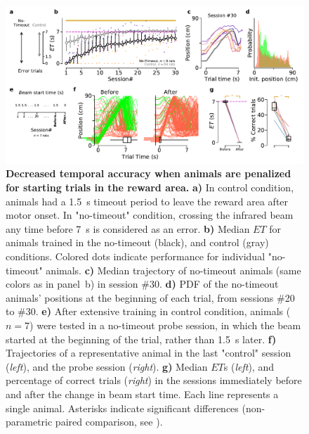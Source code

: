  \begin{figure}[bt!]
  \begin{center}
    \includegraphics[width=.8\linewidth]{ch-time/figures/NToTrd.pdf}
    \caption[No-timeout condition]
    {\textbf{Decreased temporal accuracy when animals are penalized for starting trials in the reward area.}
    \textbf{a)}
    In control condition, animals had a 1.5~s timeout period to leave the reward area after motor onset.
    In "no-timeout" condition, crossing the infrared beam any time before 7~s is considered as an error.
    \textbf{b)}
    Median $ET$ for animals trained in the no-timeout (black), and control (gray) conditions.
    Colored dots indicate performance for individual "no-timeout" animals.
    \textbf{c)}
    Median trajectory of no-timeout animals (same colors as in panel~b) in session \#30.
    \textbf{d)}
    PDF of the no-timeout animals' positions at the beginning of each trial, from sessions \#20 to \#30.
    \textbf{e)}
    After extensive training in control condition, animals ($n=7$) were tested in a no-timeout probe session, in which the beam started at the beginning of the trial, rather than 1.5~s later.
    \textbf{f)}
    Trajectories of a representative animal in the last "control" session (\textit{left}), and the probe session (\textit{right}).
    \textbf{g)}
    Median $ET$s (\textit{left}), and percentage of correct trials (\textit{right}) in the sessions immediately before and after the change in beam start time.
    Each line represents a single animal.
    Asterisks indicate significant differences (non-parametric paired comparison, see ).
    }
    \label{fig:time:ntoTrd}
  \end{center}
\end{figure}
